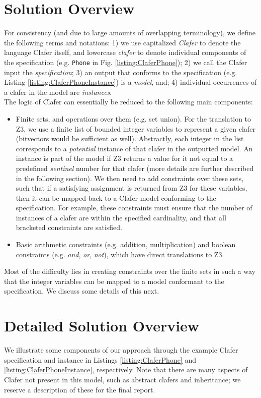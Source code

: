 \documentclass{article}
\begin{document}
\section{Solution Overview}
For consistency (and due to large amounts of overlapping terminology), we define the following terms and notations: 1) we use capitalized \textit{Clafer} to denote the language Clafer itself, and lowercase \textit{clafer} to denote individual components of the specification (e.g. \texttt{Phone} in Fig. \ref{listing:ClaferPhone}); 2) we call the Clafer input the \textit{specification}; 3) an output that conforms to the specification (e.g. Listing \ref{listing:ClaferPhoneInstance}) is a \textit{model}, and; 4) individual occurrences of a clafer in the model are \textit{instances}. \\
\indent The logic of Clafer can essentially be reduced to the following main components:
\begin{itemize}
\item Finite sets, and operations over them (e.g. set union). For the translation to Z3, we use a finite list of bounded integer variables to represent a given clafer (bitvectors would be sufficient as well). Abstractly, each integer in the list corresponds to a \textit{potential} instance of that clafer in the outputted model. An instance is part of the model if Z3 returns a value for it not equal to a predefined \textit{sentinel} number for that clafer (more details are further described in the following section). We then need to add constraints over these sets, such that if a satisfying assignment is returned from Z3 for these variables, then it can be mapped back to a Clafer model conforming to the specification. For example, these constraints must ensure that the number of instances of a clafer are within the specified cardinality, and that all bracketed constraints are satisfied.
\item Basic arithmetic constraints (e.g. addition, multiplication) and boolean constraints (e.g. \textit{and}, \textit{or}, \textit{not}), which have direct translations to Z3.
\end{itemize} 

Most of the difficulty lies in creating constraints over the finite sets in such a way that the integer variables can be mapped to a model conformant to the specification. We discuss some details of this next.

\section{Detailed Solution Overview}
We illustrate some components of our approach through the example Clafer specification and instance in Listings \ref{listing:ClaferPhone} and \ref{listing:ClaferPhoneInstance}, respectively. Note that there are many aspects of Clafer not present in this model, such as abstract clafers and inheritance; we reserve a description of these for the final report.
\end{document}
